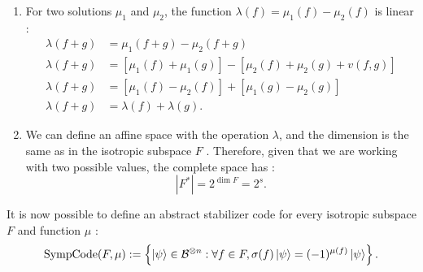 \begin{enumerate}
  \item For two solutions $\mu_1$ and $\mu_2$, the function $\lambda(f) = \mu_1(f) - \mu_2(f)$ is linear \citep{Cesar2024}:
    \begin{align*}
      \lambda(f + g) &= \mu_1(f + g) - \mu_2(f + g)\\
      \lambda(f + g) &= \left[\mu_1(f) + \mu_1(g)\right] - \left[\mu_2(f) + \mu_2(g) + v(f, g)\right]\\
      \lambda(f + g) &= \left[\mu_1(f) - \mu_2(f)\right] + \left[\mu_1(g) - \mu_2(g)\right]\\
      \lambda(f + g) &= \lambda(f) + \lambda(g)
    .\end{align*}

  \item We can define an affine space with the operation $\lambda$, and the dimension is the same as in the isotropic subspace $F$ \citep{Cesar2024}. Therefore, given that we are working with two possible values, the complete space has \citep{Kitaev2002}:
    \begin{equation}
      \left|F^*\right| = 2^{\dim F} = 2^s
      \label{eq:sol_2_n}
    .\end{equation}
\end{enumerate}

It is now possible to define an abstract stabilizer code for every isotropic subspace $F$ and function $\mu$ \citep{Kitaev2002}:
\begin{equation}
  \text{SympCode}(F, \mu) := \left\{\ket{\psi} \in \mathcal{B}^{\otimes n} : \forall f \in F, \sigma(f)\ket{\psi} = (-1)^{\mu(f)}\ket{\psi}\right\}
  \label{eq:isotropic2}
.\end{equation}

